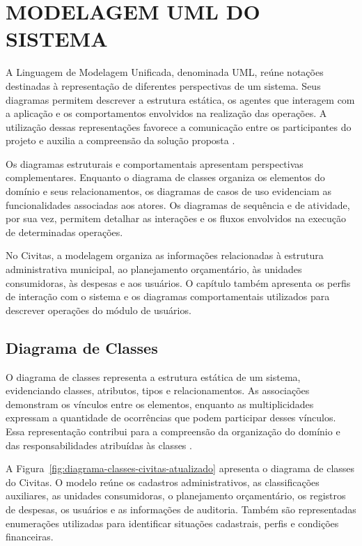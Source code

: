 
\newlength{\larguracolunascivitas}

\chapter{MODELAGEM UML DO SISTEMA}
\label{cap:modelagem-uml}

A Linguagem de Modelagem Unificada, denominada UML, reúne notações destinadas à representação de diferentes perspectivas de um sistema. Seus diagramas permitem descrever a estrutura estática, os agentes que interagem com a aplicação e os comportamentos envolvidos na realização das operações. A utilização dessas representações favorece a comunicação entre os participantes do projeto e auxilia a compreensão da solução proposta \parencite{omg2017uml,larman2005}.

Os diagramas estruturais e comportamentais apresentam perspectivas complementares. Enquanto o diagrama de classes organiza os elementos do domínio e seus relacionamentos, os diagramas de casos de uso evidenciam as funcionalidades associadas aos atores. Os diagramas de sequência e de atividade, por sua vez, permitem detalhar as interações e os fluxos envolvidos na execução de determinadas operações.

No Civitas, a modelagem organiza as informações relacionadas à estrutura administrativa municipal, ao planejamento orçamentário, às unidades consumidoras, às despesas e aos usuários. O capítulo também apresenta os perfis de interação com o sistema e os diagramas comportamentais utilizados para descrever operações do módulo de usuários.

\section{Diagrama de Classes}
\label{sec:diagrama-classes}

O diagrama de classes representa a estrutura estática de um sistema, evidenciando classes, atributos, tipos e relacionamentos. As associações demonstram os vínculos entre os elementos, enquanto as multiplicidades expressam a quantidade de ocorrências que podem participar desses vínculos. Essa representação contribui para a compreensão da organização do domínio e das responsabilidades atribuídas às classes \parencite{omg2017uml,larman2005}.

A Figura~\ref{fig:diagrama-classes-civitas-atualizado} apresenta o diagrama de classes do Civitas. O modelo reúne os cadastros administrativos, as classificações auxiliares, as unidades consumidoras, o planejamento orçamentário, os registros de despesas, os usuários e as informações de auditoria. Também são representadas enumerações utilizadas para identificar situações cadastrais, perfis e condições financeiras.

